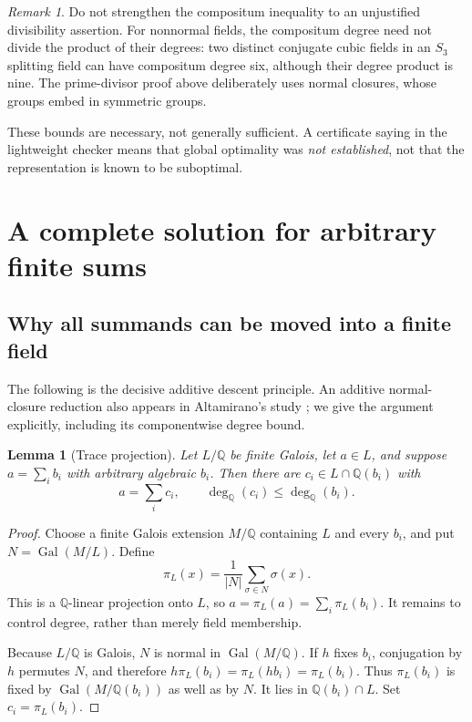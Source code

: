 \documentclass[11pt,a4paper]{article}
\newtheorem{lemma}[theorem]{Lemma}
\theoremstyle{definition}\newtheorem{definition}[theorem]{Definition}
\theoremstyle{remark}\newtheorem{remark}[theorem]{Remark}
\newcommand{\Q}{\mathbb Q}
\newcommand{\Gal}{\operatorname{Gal}}
\newcommand{\dega}{\operatorname{deg}_{\Q}}
\newcommand{\code}[1]{\texttt{\detokenize{#1}}}
\begin{document}
\begin{remark}
Do not strengthen the compositum inequality to an unjustified divisibility
assertion. For nonnormal fields, the compositum degree need not divide the
product of their degrees: two distinct conjugate cubic fields in an
$S_3$ splitting field can have compositum degree six, although their degree
product is nine. The prime-divisor proof above deliberately uses normal
closures, whose groups embed in symmetric groups.
\end{remark}

These bounds are necessary, not generally sufficient. A certificate saying
\code{GlobalOptimal -> False} in the lightweight checker means that global
optimality was \emph{not established}, not that the representation is known
to be suboptimal.

\section{A complete solution for arbitrary finite sums}
\label{sec:sums}

\subsection{Why all summands can be moved into a finite field}

The following is the decisive additive descent principle. An additive
normal-closure reduction also appears in Altamirano's study
\cite{altamirano}; we give the argument explicitly, including its
componentwise degree bound.

\begin{lemma}[Trace projection]\label{lem:trace}
Let $L/\Q$ be finite Galois, let $a\in L$, and suppose
$a=\sum_i b_i$ with arbitrary algebraic $b_i$. Then there are
$c_i\in L\cap\Q(b_i)$ with
\[
 a=\sum_i c_i,\qquad \dega(c_i)\le\dega(b_i).
\]
\end{lemma}
\begin{proof}
Choose a finite Galois extension $M/\Q$ containing $L$ and every $b_i$,
and put $N=\Gal(M/L)$. Define
\[
 \pi_L(x)=\frac1{|N|}\sum_{\sigma\in N}\sigma(x).
\]
This is a $\Q$-linear projection onto $L$, so
$a=\pi_L(a)=\sum_i\pi_L(b_i)$. It remains to control degree, rather than
merely field membership.

Because $L/\Q$ is Galois, $N$ is normal in $\Gal(M/\Q)$. If $h$ fixes
$b_i$, conjugation by $h$ permutes $N$, and therefore
$h\pi_L(b_i)=\pi_L(hb_i)=\pi_L(b_i)$. Thus $\pi_L(b_i)$ is fixed by
$\Gal(M/\Q(b_i))$ as well as by $N$. It lies in
$\Q(b_i)\cap L$. Set $c_i=\pi_L(b_i)$.
\end{proof}
\end{document}
